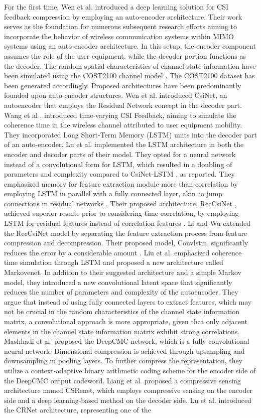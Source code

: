 \documentclass[lettersize,journal]{IEEEtran}
\begin{document}
For the first time, Wen et al. \cite{abe} introduced a deep learning solution for CSI feedback compression by employing an auto-encoder architecture. Their work serves as the foundation for numerous subsequent research efforts aiming to incorporate the behavior of wireless communication systems within MIMO systems using an auto-encoder architecture. In this setup, the encoder component assumes the role of the user equipment, while the decoder portion functions as the decoder. The random spatial characteristics of channel state information have been simulated using the COST2100 channel model \cite{abf}. The COST2100 dataset has been generated accordingly. Proposed architectures have been predominantly founded upon auto-encoder structures. Wen et al. \cite{abe} introduced CsiNet, an autoencoder that employs the Residual Network \cite{abg} concept in the decoder part. Wang et al \cite{abh}. introduced time-varying CSI Feedback, aiming to simulate the coherence time in the wireless channel attributed to user equipment mobility. They incorporated Long Short-Term Memory (LSTM) units into the decoder part of an auto-encoder. Lu et al. \cite{abi} implemented the LSTM architecture in both the encoder and decoder parts of their model. They opted for a neural network instead of a convolutional form for LSTM, which resulted in a doubling of parameters and complexity compared to CsiNet-LSTM \cite{abh}, as reported. They emphasized memory for feature extraction module more than correlation by employing LSTM in parallel with a fully connected layer, akin to jump connections in residual networks \cite{abi}. Their proposed architecture, RecCsiNet \cite{abi}, achieved superior results prior to considering time correlation, by employing LSTM for residual features instead of correlation features \cite{abh}. Li and Wu \cite{abj} extended the RecCsiNet model by separating the feature extraction process from feature compression and decompression. Their proposed model, Convlstm, significantly reduces the error by a considerable amount \cite{abj}. Liu et al. \cite{abk} emphasized coherence time simulation through LSTM and proposed a new architecture called Markovenet. In addition to their suggested architecture and a simple Markov model, they introduced a new convolutional latent space that significantly reduces the number of parameters and complexity of the autoencoder. They argue that instead of using fully connected layers to extract features, which may not be crucial in the random characteristics of the channel state information matrix, a convolutional approach is more appropriate, given that only adjacent elements in the channel state information matrix exhibit strong correlations. Mashhadi et al. \cite{abl} proposed the DeepCMC network, which is a fully convolutional neural network. Dimensional compression is achieved through upsampling and downsampling in pooling layers. To further compress the representation, they utilize a context-adaptive binary arithmetic coding scheme for the encoder side of the DeepCMC output codeword. Liang et al. \cite{abm} proposed a compressive sensing architecture named CSRenet, which employs compressive sensing on the encoder side and a deep learning-based method on the decoder side. Lu et al. \cite{abn} introduced the CRNet architecture, representing one of the 
\end{document}
